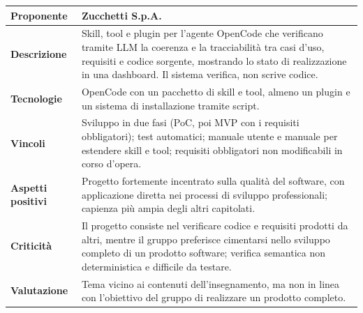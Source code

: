 \begin{longtable}{|>{\raggedright\arraybackslash}p{3.2cm}|>{\raggedright\arraybackslash}p{\dimexpr\textwidth-3.2cm-4\tabcolsep-3\arrayrulewidth\relax}|}
    \hline
    \textbf{Proponente} & Zucchetti S.p.A. \\
    \hline
    \textbf{Descrizione} & Skill, tool e plugin per l'agente OpenCode che verificano tramite LLM la coerenza e la tracciabilità tra casi d'uso, requisiti e codice sorgente, mostrando lo stato di realizzazione in una dashboard. Il sistema verifica, non scrive codice. \\
    \hline
    \textbf{Tecnologie} & OpenCode con un pacchetto di skill e tool, almeno un plugin e un sistema di installazione tramite script. \\
    \hline
    \textbf{Vincoli} & Sviluppo in due fasi (PoC, poi MVP con i requisiti obbligatori); test automatici; manuale utente e manuale per estendere skill e tool; requisiti obbligatori non modificabili in corso d'opera. \\
    \hline
    \textbf{Aspetti positivi} & Progetto fortemente incentrato sulla qualità del software, con applicazione diretta nei processi di sviluppo professionali; capienza più ampia degli altri capitolati. \\
    \hline
    \textbf{Criticità} & Il progetto consiste nel verificare codice e requisiti prodotti da altri, mentre il gruppo preferisce cimentarsi nello sviluppo completo di un prodotto software; verifica semantica non deterministica e difficile da testare. \\
    \hline
    \textbf{Valutazione} & Tema vicino ai contenuti dell'insegnamento, ma non in linea con l'obiettivo del gruppo di realizzare un prodotto completo. \\
    \hline
\end{longtable}
